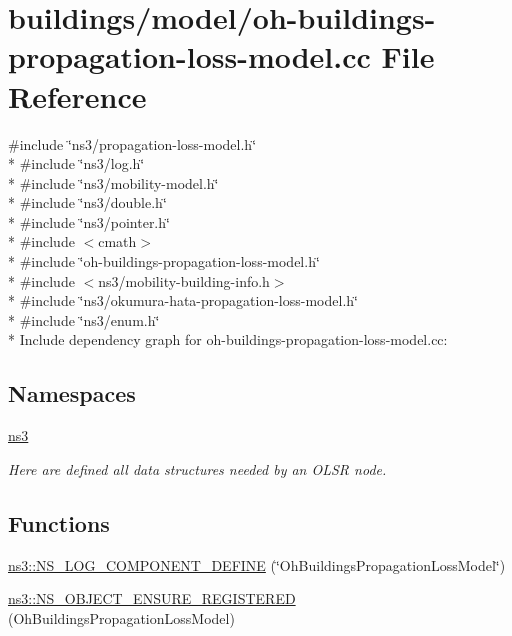 \hypertarget{oh-buildings-propagation-loss-model_8cc}{}\section{buildings/model/oh-\/buildings-\/propagation-\/loss-\/model.cc File Reference}
\label{oh-buildings-propagation-loss-model_8cc}
{\ttfamily \#include \char`\"{}ns3/propagation-\/loss-\/model.\+h\char`\"{}}\\*
{\ttfamily \#include \char`\"{}ns3/log.\+h\char`\"{}}\\*
{\ttfamily \#include \char`\"{}ns3/mobility-\/model.\+h\char`\"{}}\\*
{\ttfamily \#include \char`\"{}ns3/double.\+h\char`\"{}}\\*
{\ttfamily \#include \char`\"{}ns3/pointer.\+h\char`\"{}}\\*
{\ttfamily \#include $<$cmath$>$}\\*
{\ttfamily \#include \char`\"{}oh-\/buildings-\/propagation-\/loss-\/model.\+h\char`\"{}}\\*
{\ttfamily \#include $<$ns3/mobility-\/building-\/info.\+h$>$}\\*
{\ttfamily \#include \char`\"{}ns3/okumura-\/hata-\/propagation-\/loss-\/model.\+h\char`\"{}}\\*
{\ttfamily \#include \char`\"{}ns3/enum.\+h\char`\"{}}\\*
Include dependency graph for oh-\/buildings-\/propagation-\/loss-\/model.cc\+:
\subsection*{Namespaces}
\begin{DoxyCompactItemize}
\item 
 \hyperlink{namespacens3}{ns3}
\begin{DoxyCompactList}\small\item\em Here are defined all data structures needed by an O\+L\+SR node. \end{DoxyCompactList}\end{DoxyCompactItemize}
\subsection*{Functions}
\begin{DoxyCompactItemize}
\item 
\hyperlink{namespacens3_aaf3f65a3d5571a501453c4e1e19ed816}{ns3\+::\+N\+S\+\_\+\+L\+O\+G\+\_\+\+C\+O\+M\+P\+O\+N\+E\+N\+T\+\_\+\+D\+E\+F\+I\+NE} (\char`\"{}Oh\+Buildings\+Propagation\+Loss\+Model\char`\"{})
\item 
\hyperlink{namespacens3_a38a88bb4e192bc94c4007a0724f33b2e}{ns3\+::\+N\+S\+\_\+\+O\+B\+J\+E\+C\+T\+\_\+\+E\+N\+S\+U\+R\+E\+\_\+\+R\+E\+G\+I\+S\+T\+E\+R\+ED} (Oh\+Buildings\+Propagation\+Loss\+Model)
\end{DoxyCompactItemize}
